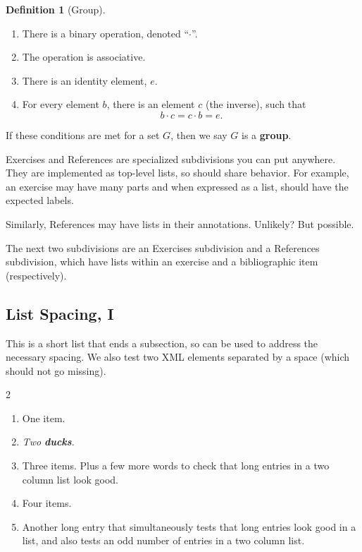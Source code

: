 \documentclass{amsart}
\theoremstyle{plain}%
\theoremstyle{definition}%
\newtheorem{definition}[theorem]{Definition}
\theoremstyle{remark}%
\newcommand{\alert}[1]{\textbf{\textit{#1}}}
\newcommand{\terminology}[1]{\textbf{#1}}
\numberwithin{equation}{section}
\begin{document}
\begin{definition}[Group]\label{section-lists-2-18}%
%
%
%
\begin{enumerate}[label={\alph*)}]
\item{}There is a binary operation, denoted ``\(\cdot\)''.%
\item{}The operation is associative.%
\item{}There is an identity element, \(e\).%
\item{}For every element \(b\), there is an element \(c\) (the inverse), such that%
\begin{equation*}
b\cdot c=c\cdot b = e\text{.}
\end{equation*}
%
\end{enumerate}
%
\par
If these conditions are met for a set \(G\), then we say \(G\) is a \terminology{group}.%
\end{definition}
Exercises and References are specialized subdivisions you can put anywhere.  They are implemented as top-level lists, so should share behavior.  For example, an exercise may have many parts and when expressed as a list, should have the expected labels.%
\par
Similarly, References may have lists in their annotations.  Unlikely?  But possible.%
\par
The next two subdivisions are an Exercises subdivision and a References subdivision, which have lists within an exercise and a bibliographic item (respectively).%
%
%
\typeout{************************************************}
\typeout{************************************************}
%
\subsection{List Spacing, I}\label{section-lists-3}%
This is a short list that ends a subsection, so can be used to address the necessary spacing.  We also test two XML elements separated by a space (which should not go missing).%
\begin{multicols}{2}
\begin{enumerate}[label={(\alph*)}]
\item{}One item.%
\item{}\emph{Two} \alert{ducks}.%
\item{}Three items.  Plus a few more words to check that long entries in a two column list look good.%
\item{}Four items.%
\item{}Another long entry that simultaneously tests that long entries look good in a list, and also tests an odd number of entries in a two column list.%
\end{enumerate}
\end{multicols}
%
%
%
\typeout{************************************************}
\typeout{************************************************}
%
\end{document}
